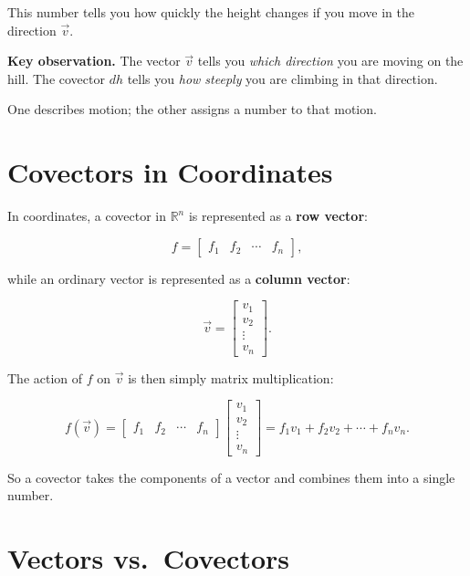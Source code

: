 \documentclass[11pt,openany]{book}
\theoremstyle{definition}
\begin{document}
This number tells you how quickly the height changes if you move in the direction $\vec{v}$.

\medskip

\textbf{Key observation.} The vector $\vec{v}$ tells you \textit{which direction} you are moving 
on the hill. The covector $dh$ tells you \textit{how steeply} you are climbing in that direction.

\medskip

One describes motion; the other assigns a number to that motion.

\medskip

\section{Covectors in Coordinates}

In coordinates, a covector in $\mathbb{R}^n$ is represented as a \textbf{row vector}:

\[
f = \begin{bmatrix} f_1 & f_2 & \cdots & f_n \end{bmatrix},
\]

while an ordinary vector is represented as a \textbf{column vector}:

\[
\vec{v} =
\begin{bmatrix}
v_1 \\
v_2 \\
\vdots \\
v_n
\end{bmatrix}.
\]

\medskip

The action of $f$ on $\vec{v}$ is then simply matrix multiplication:

\[
f(\vec{v}) =
\begin{bmatrix} f_1 & f_2 & \cdots & f_n \end{bmatrix}
\begin{bmatrix} v_1 \\ v_2 \\ \vdots \\ v_n \end{bmatrix}
= f_1 v_1 + f_2 v_2 + \cdots + f_n v_n.
\]

\medskip

So a covector takes the components of a vector and combines them into a single number.

\section{Vectors vs.\ Covectors}
\end{document}
